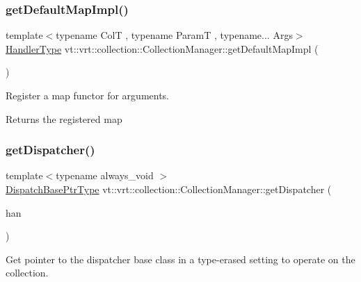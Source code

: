 \subsubsection{\texorpdfstring{get\+Default\+Map\+Impl()}{getDefaultMapImpl()}}
{\footnotesize\ttfamily template$<$typename ColT , typename ParamT , typename... Args$>$ \\
\hyperlink{namespacevt_af64846b57dfcaf104da3ef6967917573}{Handler\+Type} vt\+::vrt\+::collection\+::\+Collection\+Manager\+::get\+Default\+Map\+Impl (\begin{DoxyParamCaption}\item[{std\+::tuple$<$ Args... $>$}]{ }\end{DoxyParamCaption})\hspace{0.3cm}{\ttfamily [static]}}



Register a map functor for arguments. 

\begin{DoxyReturn}{Returns}
the registered map 
\end{DoxyReturn}
\mbox{\label{structvt_1_1vrt_1_1collection_1_1_collection_manager_af183a018e0d2d8b3ed024244d8f83f45}} 
\subsubsection{\texorpdfstring{get\+Dispatcher()}{getDispatcher()}}
{\footnotesize\ttfamily template$<$typename always\+\_\+void $>$ \\
\hyperlink{namespacevt_1_1vrt_1_1collection_aa3b9731ae16d60fac43d68840f3606a5}{Dispatch\+Base\+Ptr\+Type} vt\+::vrt\+::collection\+::\+Collection\+Manager\+::get\+Dispatcher (\begin{DoxyParamCaption}\item[{\hyperlink{structvt_1_1vrt_1_1collection_1_1_collection_manager_a0cfe02a0426e95ec9daa2ef7374e07c7}{Dispatch\+Handler\+Type} const \&}]{han }\end{DoxyParamCaption})}



Get pointer to the dispatcher base class in a type-\/erased setting to operate on the collection. 


